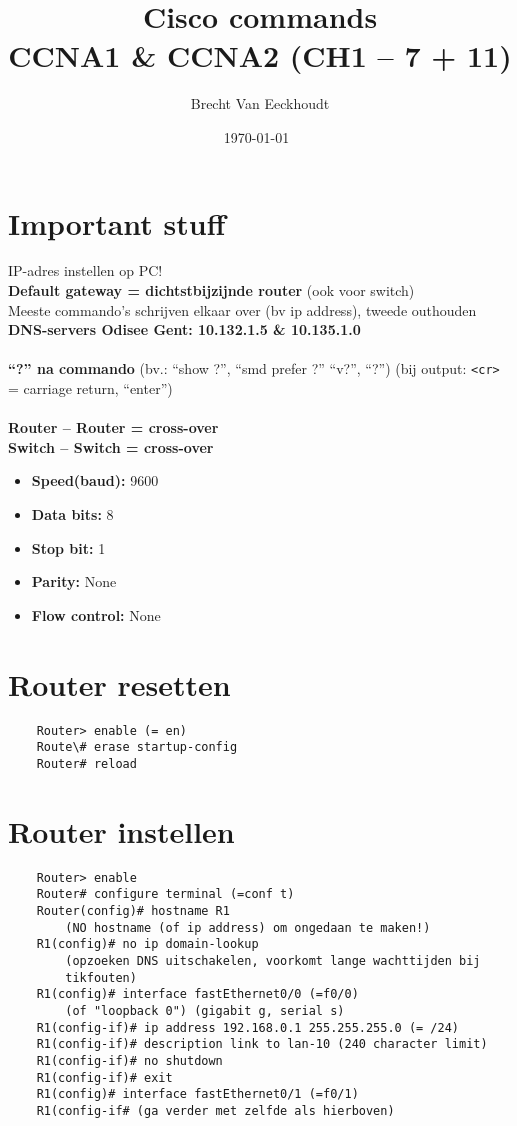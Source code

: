\documentclass[10pt, a4paper]{article}
\title{Cisco commands \\CCNA1 \& CCNA2 (CH1 -- 7 + 11)}
\author{Brecht Van Eeckhoudt}
\date{\today \ \currenttime}
\begin{document}
	\maketitle

	\section{Important stuff}
	IP-adres instellen op PC!\\
	\textbf{Default gateway = dichtstbijzijnde router }(ook voor switch)\\
	Meeste commando's schrijven elkaar over (bv ip address), tweede outhouden\\
	\textbf{DNS-servers Odisee Gent: 10.132.1.5 \& 10.135.1.0}\\ \\
	\textbf{``?'' na commando} (bv.: ``show ?'', ``smd prefer ?'' ``v?'', ``?'') (bij output: \texttt{<cr>} = carriage return, ``enter'')\\ \\
	\textbf{Router -- Router = cross-over}\\
	\textbf{Switch -- Switch = cross-over}\\
	\begin{itemize}[noitemsep,nolistsep]
		\item \textbf{Speed(baud):} 9600
		\item \textbf{Data bits:} 8
		\item \textbf{Stop bit:} 1
		\item \textbf{Parity:} None
		\item \textbf{Flow control:} None\\
	\end{itemize}

	\section{Router resetten}
	\begin{lstlisting}
	Router> enable (= en)
	Route\# erase startup-config
	Router# reload
	\end{lstlisting}

	\section{Router instellen}
	\begin{lstlisting}
	Router> enable
	Router# configure terminal (=conf t)
	Router(config)# hostname R1
		(NO hostname (of ip address) om ongedaan te maken!)
	R1(config)# no ip domain-lookup
		(opzoeken DNS uitschakelen, voorkomt lange wachttijden bij
		tikfouten)
	R1(config)# interface fastEthernet0/0 (=f0/0)
		(of "loopback 0") (gigabit g, serial s)
	R1(config-if)# ip address 192.168.0.1 255.255.255.0 (= /24)
	R1(config-if)# description link to lan-10 (240 character limit)
	R1(config-if)# no shutdown
	R1(config-if)# exit
	R1(config)# interface fastEthernet0/1 (=f0/1)
	R1(config-if# (ga verder met zelfde als hierboven)
	\end{lstlisting}
\end{document}
